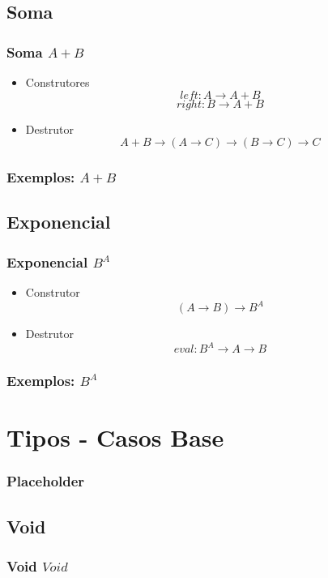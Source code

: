 \documentclass{beamer}
\begin{document}
\subsection{Soma}
\begin{frame}
    \frametitle{Soma \(A + B\)}
    \begin{itemize}
        \item Construtores
            \[
                left : A \to A + B
            \]
            \[
                right : B \to A + B
            \]
        \item Destrutor
            \[
                A + B \to (A \to C) \to (B \to C) \to C
            \]
    \end{itemize}
\end{frame}

\begin{frame}
    \frametitle{Exemplos: \(A + B\)}
\end{frame}

\subsection{Exponencial}
\begin{frame}
    \frametitle{Exponencial \(B^A\)}
    \begin{itemize}
        \item Construtor
            \[
                (A \to B) \to B^A
            \]
        \item Destrutor
            \[
                eval : B^A \to A \to B
            \]
    \end{itemize}
\end{frame}

\begin{frame}
    \frametitle{Exemplos: \(B^A\)}
\end{frame}

\section{Tipos - Casos Base}
\begin{frame}
    \frametitle{Placeholder}
\end{frame}

\subsection{Void}
\begin{frame}
    \frametitle{Void \(Void\)}
\end{frame}
\end{document}
